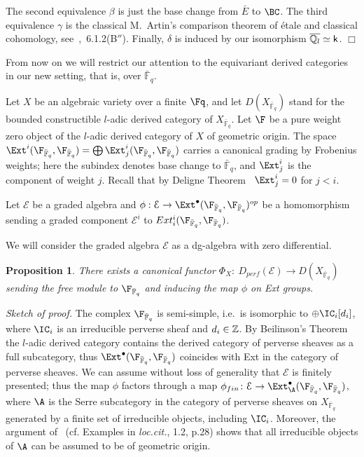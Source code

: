 \documentclass[11pt]{amsart}
\newtheorem{prop}{Proposition}
\theoremstyle{definition}
\theoremstyle{remark}
\theoremstyle{remark}
\newcommand{\Qlbar}{{\overline {{\Bbb Q}_l} }}
\newcommand{\bu}{\bullet}
\newcommand{\<}{\langle}
\renewcommand{\>}{\rangle}
\newcommand{\oplusl}{\bigoplus\limits}
\newcommand{\Zet}{{\Bbb Z}}
\newcommand{\Fqbar}{{\bar{\mathbb F}_q}}
\newcommand{\kk}{\mathsf k}
\newcommand{\Epur}{{\mathcal E}}
\begin{document}
The second equivalence $\beta$ is just the base change from $\bar E$ to
$\BC$. The third equivalence $\gamma$ is the classical M.~Artin's comparison
theorem of {\'e}tale and classical cohomology, see~\cite{BBD},~6.1.2(B$''$). 
Finally, $\delta$ is induced by our isomorphism $\Qlbar\simeq\kk$.
\hfill $\Box$

\bigskip

From now on we will restrict our attention to the equivariant derived
categories in our new setting, that is, over $\Fqbar$.

Let $X$ be an algebraic variety over a finite $\Fq$, and
let $D(X_{\Fqbar})$ stand for the bounded constructible $l$-adic
derived category of $X_{\Fqbar}$.
Let $\F$ be a pure weight zero object of the 
$l$-adic derived category of $X$ of geometric origin.
 The space $\Ext^i(\F_{\Fqbar},\F_{\Fqbar})=\oplusl
\Ext^i_j(\F_{\Fqbar},\F_{\Fqbar})$ carries a canonical
grading by Frobenius weights;
here the subindex
denotes base change to $\Fqbar$, and $\Ext^i_j$ is the component 
of weight $j$. Recall that by Deligne Theorem~\cite{W2}
 $\Ext^i_j=0$ for $j<i$.

Let $\Epur$ be a graded algebra and $\phi:\Epur\to \Ext^\bu(\F_{\Fqbar},\F_{\Fqbar})^{op}$ 
be a homomorphism
sending a graded component $\Epur^i$ to $Ext^i_i(\F_{\Fqbar},\F_{\Fqbar})$.

We will consider the graded algebra $\Epur$ as a dg-algebra with zero differential.

\begin{prop}\label{general}
There exists a canonical functor 
$\Phi_X:\ D_{perf}(\Epur)\to D(X_{\Fqbar})$ sending the free module
to $\F_\Fqbar$ and inducing the map $\phi$ on Ext groups. 
\end{prop}


{\em Sketch of proof.}  The complex $\F_\Fqbar$ is semi-simple, i.e.\ is isomorphic
to $\oplus \IC_i[d_i]$, where $\IC_i$ is an irreducible perverse sheaf and $d_i\in \Zet$.
By Beilinson's Theorem \cite{Bedr} the $l$-adic derived 
category
contains the derived category of perverse sheaves as a full subcategory, thus 
$\Ext^\bu(\F_{\Fqbar},\F_{\Fqbar})$ coincides with Ext in the category of perverse sheaves.
We can assume without loss of generality that $\Epur$ is finitely presented; thus the map $\phi$
factors through a map $\phi_{fin}\colon \Epur\to \Ext^\bu_{\A} (\F_{\Fqbar},\F_{\Fqbar})$, where $\A$ 
is the Serre subcategory in the category of perverse sheaves on $X_\Fqbar$
generated by a finite set of irreducible 
objects, including $\IC_i$. Moreover, the argument 
of~\cite{Bedr} (cf. Examples in {\em loc.cit.}, 1.2, p.28) shows
that all irreducible objects of $\A$ can be assumed to be of geometric origin.
\end{document}
